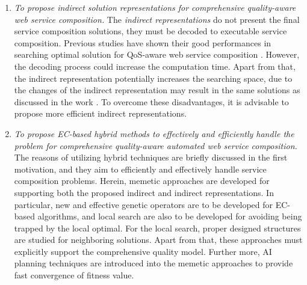 \begin{enumerate}
\begin{enumerate}
     \item \emph{To propose indirect solution representations for comprehensive quality-aware web service composition.} The \emph{indirect representations} do not present the final service composition solutions, they must be decoded to executable service composition. Previous studies have shown their good performances in searching optimal solution for QoS-aware web service composition \cite{da2016memetic,da2016particle}. However, the decoding process could increase the computation time. Apart from that, the indirect representation potentially increases the searching space, due to the changes of the indirect representation may result in the same solutions as discussed in the work \cite{da2016particle}. To overcome these disadvantages, it is advisable to propose more efficient indirect representations.
    
    \item \emph{To propose EC-based hybrid methods to effectively and efficiently handle the problem for comprehensive quality-aware automated web service composition.} The reasons of utilizing hybrid techniques are briefly discussed in the first motivation, and they aim to efficiently and effectively handle service composition problems. Herein, memetic approaches are developed for supporting both the proposed indirect and indirect representations. In particular, new and effective genetic operators are to be developed for EC-based algorithms, and local search are also to be developed for avoiding being trapped by the local optimal. For the local search, proper designed structures are studied for neighboring solutions. Apart from that, these approaches must explicitly support the comprehensive quality model. Further more, AI planning techniques are introduced into the memetic approaches to provide fast convergence of fitness value.
  \end{enumerate}
 

\end{enumerate}
